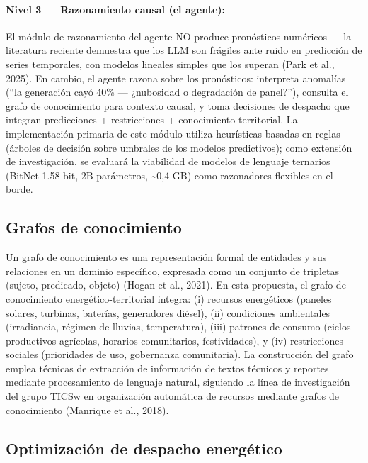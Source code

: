 \documentclass[12pt,letterpaper]{article}
\begin{document}
\paragraph{Nivel 3 --- Razonamiento causal (el agente):}
El m\'odulo de razonamiento del agente NO produce pron\'osticos num\'ericos --- la literatura reciente demuestra que los LLM son fr\'agiles ante ruido en predicci\'on de series temporales, con modelos lineales simples que los superan (Park et al., 2025). En cambio, el agente razona sobre los pron\'osticos: interpreta anomal\'ias (``la generaci\'on cay\'o 40\% --- ¿nubosidad o degradaci\'on de panel?''), consulta el grafo de conocimiento para contexto causal, y toma decisiones de despacho que integran predicciones + restricciones + conocimiento territorial. La implementaci\'on primaria de este m\'odulo utiliza heur\'isticas basadas en reglas (\'arboles de decisi\'on sobre umbrales de los modelos predictivos); como extensi\'on de investigaci\'on, se evaluar\'a la viabilidad de modelos de lenguaje ternarios (BitNet 1.58-bit, 2B par\'ametros, \textasciitilde0,4 GB) como razonadores flexibles en el borde.

\subsection{Grafos de conocimiento}

Un grafo de conocimiento es una representaci\'on formal de entidades y sus relaciones en un dominio espec\'ifico, expresada como un conjunto de tripletas (sujeto, predicado, objeto) (Hogan et al., 2021). En esta propuesta, el grafo de conocimiento energ\'etico-territorial integra: (i) recursos energ\'eticos (paneles solares, turbinas, bater\'ias, generadores di\'esel), (ii) condiciones ambientales (irradiancia, r\'egimen de lluvias, temperatura), (iii) patrones de consumo (ciclos productivos agr\'icolas, horarios comunitarios, festividades), y (iv) restricciones sociales (prioridades de uso, gobernanza comunitaria). La construcci\'on del grafo emplea t\'ecnicas de extracci\'on de informaci\'on de textos t\'ecnicos y reportes mediante procesamiento de lenguaje natural, siguiendo la l\'inea de investigaci\'on del grupo TICSw en organizaci\'on autom\'atica de recursos mediante grafos de conocimiento (Manrique et al., 2018).

\subsection{Optimizaci\'on de despacho energ\'etico}
\end{document}
